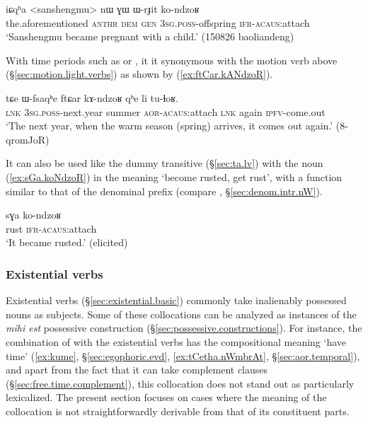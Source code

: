  \begin{exe}
\ex \label{ex:WrJit.konzdoR}
\gll iɕqʰa <sanshengmu> nɯ ɣɯ ɯ-rɟit ko-ndzoʁ \\
the.aforementioned  \textsc{anthr} \textsc{dem} \textsc{gen} \textsc{3sg}.\textsc{poss}-offspring \textsc{ifr}-\textsc{acaus}:attach \\
\glt `Sanshengmu became pregnant with a child.' (150826 baoliandeng)
 \end{exe} 
  
With time periods such as  or , it it synonymous with the motion verb  above (§\ref{sec:motion.light.verbs}) as shown by (\ref{ex:ftCar.kANdzoR}).
  
\begin{exe}
\ex \label{ex:ftCar.kANdzoR}
\gll  tɕe ɯ-fsaqʰe ftɕar kɤ-ndzoʁ qʰe li tu-ɬoʁ. \\
\textsc{lnk} \textsc{3sg}.\textsc{poss}-next.year summer \textsc{aor}-\textsc{acaus}:attach \textsc{lnk} again \textsc{ipfv}-come.out \\
\glt  `The next year, when the warm season (spring) arrives, it comes out again.' (8-qromJoR)
 \end{exe}  

It can also be used like the dummy transitive  (§\ref{sec:ta.lv}) with the noun  (\ref{ex:sGa.koNdzoR}) in the meaning `become rusted, get rust', with a function similar to that of the  denominal prefix (compare , §\ref{sec:denom.intr.nW}).

\begin{exe}
\ex \label{ex:sGa.koNdzoR}
\gll sɣa ko-ndzoʁ \\
rust \textsc{ifr}-\textsc{acaus}:attach  \\
\glt `It became rusted.' (elicited)
\end{exe}  

 
\subsubsection{Existential verbs} \label{sec:existential.light.verbs}
Existential verbs (§\ref{sec:existential.basic}) commonly take inalienably possessed nouns as subjects. Some of these collocations can be analyzed as instances of the \textit{mihi est} possessive construction (§\ref{sec:possessive.constructions}). For instance, the combination of  with the existential verbs has the compositional meaning `have time' (\ref{ex:kume}, §\ref{sec:egophoric.evd}, \ref{ex:tCetha.nWmbrAt}, §\ref{sec:aor.temporal}), and apart from the fact that it can take complement clauses (§\ref{sec:free.time.complement}), this collocation does not stand out as particularly lexicalized. The present section focuses on cases where the meaning of the collocation is not straightforwardly derivable from that of its constituent parts.

